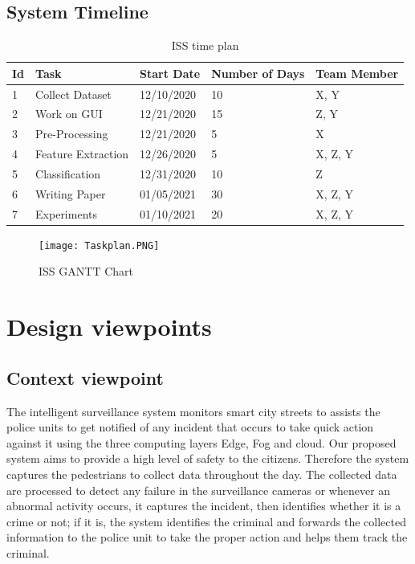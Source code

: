 \documentclass[12pt]{article}
\begin{document}
\subsection {System Timeline}

\begin{table}[htbp]
\centering
\caption{ISS time plan}
\label{tab:Time Plan}
\begin{tabular}{|l|l|l|l|l|}
\hline
Id & Task               & Start Date & Number of Days & Team Member \\ \hline
1  & Collect Dataset    & 12/10/2020 & 10             & X, Y        \\ \hline
2  & Work on GUI        & 12/21/2020 & 15             & Z, Y        \\ \hline
3  & Pre-Processing     & 12/21/2020 & 5              & X           \\ \hline
4  & Feature Extraction & 12/26/2020 & 5              & X, Z, Y     \\ \hline
5  & Classification     & 12/31/2020 & 10             & Z           \\ \hline
6  & Writing Paper      & 01/05/2021 & 30             & X, Z, Y     \\ \hline
7  & Experiments        & 01/10/2021 & 20             & X, Z, Y     \\ \hline
\end{tabular}
\end{table}

\begin{figure}[htbp]
\centering
\texttt{[image: Taskplan.PNG]}
\caption{ISS GANTT Chart}
\label{fig:GANTT Chart}
\end{figure}

\clearpage
\section{Design viewpoints} 
\subsection{ Context viewpoint}
The intelligent surveillance system monitors smart city streets to assists the police units to get notified of any incident that occurs to take quick action against it using the three computing layers Edge, Fog and cloud. Our proposed system aims to provide a high level of safety to the citizens. Therefore the system captures the pedestrians to collect data throughout the day. The collected data are processed to detect any failure in the surveillance cameras or whenever an abnormal activity occurs, it captures the incident, then identifies whether it is a crime or not; if it is, the system identifies the criminal and forwards the collected information to the police unit to take the proper action and helps them track the criminal.
\end{document}
